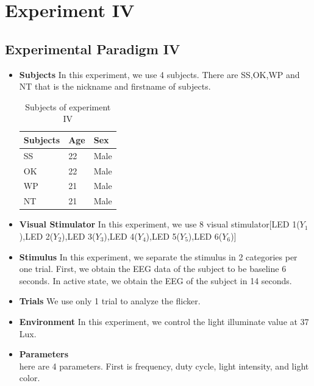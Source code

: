 \newpage
\section{Experiment IV}
\subsection{Experimental Paradigm IV}
\begin{itemize}
\item{\textbf{Subjects}}\newline
In this experiment, we use 4 subjects. There are SS,OK,WP and NT that is the nickname and firstname of subjects.


\begin{table}[ht]
\centering
\tabulinesep=1.5mm
\begin{tabu}{| P{.2\linewidth} | P{.2\linewidth} | P{.2\linewidth} |}
			\hline 
			\textbf{Subjects} & \textbf{Age}  & \textbf{Sex}\\
			\hline 
			SS & 22 & Male\\
			\hline 
			OK & 22 & Male\\
			\hline 
			WP & 21 & Male\\
			\hline 
			NT & 21 & Male\\
			\hline
		\end{tabu}       
\caption{Subjects of experiment IV}
\label{table:2}
\end{table}

\item{\textbf{Visual Stimulator}}
In this experiment, we use 8 visual stimulator[LED 1($Y_1$),LED 2($Y_2$),LED 3($Y_3$),LED 4($Y_4$),LED 5($Y_5$),LED 6($Y_6$)]
\item{\textbf{Stimulus}}
In this experiment, we separate the stimulus in 2 categories per one trial.
First, we obtain the EEG data of the subject to be baseline 6 seconds.
In active state, we obtain the EEG of the subject in 14 seconds.
\item{\textbf{Trials}}
We use only 1 trial to analyze the flicker.
\item{\textbf{Environment}}
In this experiment, we control the light illuminate value at 37 Lux.
\item{\textbf{Parameters}}\\
here are 4 parameters. First is frequency, duty cycle, light intensity, and light color.
\end{itemize}


